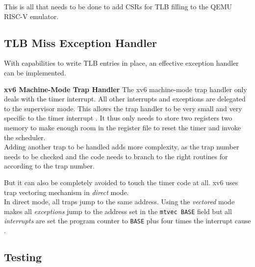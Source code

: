 This is all that needs to be done to add CSRs for TLB filling to the QEMU RISC-V emulator.




\subsection{TLB Miss Exception Handler}
With capabilities to write TLB entries in place, an effective exception handler can be implemented.

\textbf{xv6 Machine-Mode Trap Handler} The xv6 machine-mode trap handler only deals
with the timer interrupt. All other interrupts and exceptions are delegated to the supervisor
mode. This allows the trap handler to be very small and very specific to the timer interrupt \cite{cox2011xv6}.
It thus only needs to store two registers two memory to make enough room in the register file
to reset the timer and invoke the scheduler.\\
Adding another trap to be handled adds more complexity, as the trap number needs to be checked
and the code needs to branch to the right routines for according to the trap number.

But it can also be completely avoided to touch the timer code at all. xv6 uses trap vectoring
mechanism in \textit{direct} mode.\\ In direct mode, all traps jump to the same address.
Using the \textit{vectored} mode makes all \textit{exceptions} jump to the address set
in the \texttt{mtvec BASE} field but all \textit{interrupts} are set the program counter
to \texttt{BASE} plus four times the interrupt cause \cite{RISCVInstructionSet}.

\subsection{Testing}



